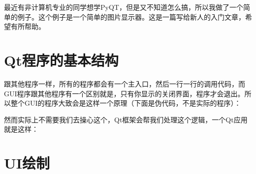 \documentclass[12pt]{article}
\begin{document}
\makeblogtitle

最近有非计算机专业的同学想学PyQT，但是又不知道怎么搞，所以我做了一个简单的例子。这个例子是一个简单的图片显示器。这是一篇写给新人的入门文章，希望有所帮助。

\section{Qt程序的基本结构}\label{qtux7a0bux5e8fux7684ux57faux672cux7ed3ux6784}

跟其他程序一样，所有的程序都会有一个主入口，然后一行一行的调用代码，而GUI程序跟其他程序有一个区别就是，只有你显示的关闭界面，程序才会退出。所以整个GUI的程序大致会是这样一个原理（下面是伪代码，不是实际的程序）：

\begin{Shaded}
\begin{Highlighting}[]
 \OperatorTok{()} \OperatorTok{\{}
    \OperatorTok{(}\OperatorTok{)} \OperatorTok{\{}
\OperatorTok{=} \OperatorTok{()}
        \OperatorTok{(}\OperatorTok{==}\OperatorTok{):}
            \OperatorTok{();}
    \OperatorTok{\}}
\OperatorTok{\}}
\end{Highlighting}
\end{Shaded}

然而实际上不需要我们去操心这个，Qt框架会帮我们处理这个逻辑，一个Qt应用就是这样：

\begin{Shaded}
\begin{Highlighting}[]
\OperatorTok{=}
\OperatorTok{=}

  \OperatorTok{==} \NormalTok{:}
\end{Highlighting}
\end{Shaded}

\section{UI绘制}\label{uiux7ed8ux5236}
\end{document}
